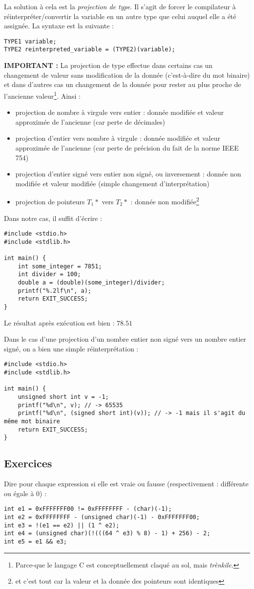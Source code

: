 \documentclass[../../../main.tex]{subfiles}
\begin{document}
La solution à cela est la \textit{projection de type}. Il s'agit de forcer le compilateur à réinterpréter/convertir la variable en un autre type que celui auquel elle a été assignée. La syntaxe est la suivante :
\begin{verbatim}
TYPE1 variable;
TYPE2 reinterpreted_variable = (TYPE2)(variable);
\end{verbatim}
\textbf{IMPORTANT :} La projection de type effectue dans certains cas un changement de valeur sans modification de la donnée (c'est-à-dire du mot binaire) et dans d'autres cas un changement de la donnée pour rester au plus proche de l'ancienne valeur\footnote{Parce-que le langage C est conceptuellement claqué au sol, mais \textit{trènkile}.}. Ainsi :
\begin{itemize}
	\item projection de nombre à virgule vers entier : donnée modifiée et valeur approximée de l'ancienne (car perte de décimales)
	\item projection d'entier vers nombre à virgule : donnée modifiée et valeur approximée de l'ancienne (car perte de précision du fait de la norme IEEE 754)
	\item projection d'entier signé vers entier non signé, ou inversement : donnée non modifiée et valeur modifiée (simple changement d'interprétation)
	\item projection de pointeurs $T_1*$ vers $T_2*$ : donnée non modifiée\footnote{et c'est tout car la valeur et la donnée des pointeurs sont identiques}
\end{itemize}
Dans notre cas, il suffit d'écrire :
\begin{verbatim}
#include <stdio.h>
#include <stdlib.h>

int main() {
	int some_integer = 7851;
	int divider = 100;
	double a = (double)(some_integer)/divider;
	printf("%.2lf\n", a);
	return EXIT_SUCCESS;
}
\end{verbatim}
Le résultat après exécution est bien : $78.51$

Dans le cas d'une projection d'un nombre entier non signé vers un nombre entier signé, on  a bien une simple réinterprétation : 
\begin{verbatim}
#include <stdio.h>
#include <stdlib.h>

int main() {
	unsigned short int v = -1;
	printf("%d\n", v); // -> 65535
	printf("%d\n", (signed short int)(v)); // -> -1 mais il s'agit du même mot binaire
	return EXIT_SUCCESS;
}
\end{verbatim}
\subsection{Exercices}
\newline
Dire pour chaque expression si elle est vraie ou fausse (respectivement : différente ou égale à 0) :
\begin{verbatim}
int e1 = 0xFFFFFFF00 != 0xFFFFFFFF - (char)(-1);
int e2 = 0xFFFFFFFF - (unsigned char)(-1) - 0xFFFFFFF00;
int e3 = !(e1 == e2) || (1 ^ e2);
int e4 = (unsigned char)(!(((64 ^ e3) % 8) - 1) + 256) - 2;
int e5 = e1 && e3;
\end{verbatim}
\end{document}
